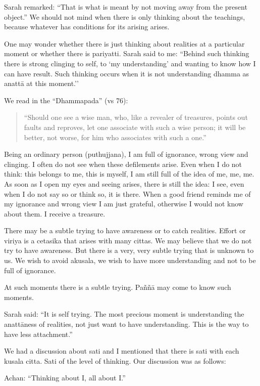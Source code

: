 Sarah remarked: ``That is what is meant by not moving away from the present object.'' We should not mind when there is only thinking about the teachings, because 
whatever has conditions for its arising arises. 

One may wonder whether there is just thinking about realities at a particular moment 
or whether there is pariyatti. Sarah said to me: ``Behind such thinking there is strong 
clinging to self, to `my understanding’ and wanting to know how I can have result. 
Such thinking occurs when it is not understanding dhamma as anattā at this moment.'' 

We read in the ``Dhammapada'' (vs 76):
\begin{quote}

 ``Should one see a wise man, who, like a revealer of treasures, points out faults and reproves, let one associate with such a wise 
person; it will be better, not worse, for him who associates with such a one.'' 
\end{quote}

Being an ordinary person (puthujjana), I am full of ignorance, wrong view and clinging. I often do not see when these defilements arise. Even when I do not think: this 
belongs to me, this is myself, I am still full of the idea of me, me, me. As soon as I 
open my eyes and seeing arises, there is still the idea: I see, even when I do not say so 
or think so, it is there. When a good friend reminds me of my ignorance and wrong 
view I am just grateful, otherwise I would not know about them. I receive a treasure. 

There may be a subtle trying to have awareness or to catch realities. Effort or viriya is 
a cetasika that arises with many cittas. We may believe that we do not try to have 
awareness. But there is a very, very subtle trying that is unknown to us. We wish to 
avoid akusala, we wish to have more understanding and not to be full of ignorance. 

At such moments there is a subtle trying. Paññā may come to know such moments. 

Sarah said: ``It is self trying. The most precious moment is understanding the anattāness of realities, not just want to have understanding. This is the way to have less attachment.'' 

We had a discussion about sati and I mentioned that there is sati with each kusala 
citta. Sati of the level of thinking. Our discussion was as follows: 

Achan: ``Thinking about I, all about I.'' 


